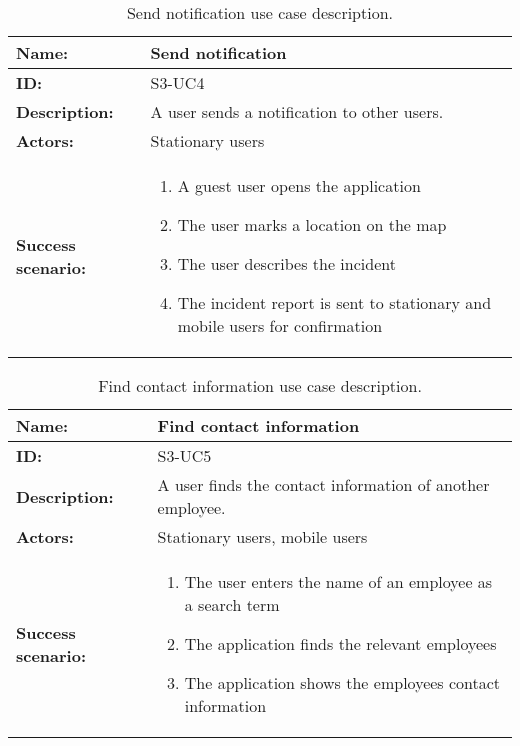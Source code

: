 \begin{table}[h!]
    \centering
    \begin{tabularx}{\textwidth}{|l|X|}
        \hline
        \textbf{Name:}  & Send notification \\ \hline
        \textbf{ID:}    & S3-UC4 \\ \hline
        \textbf{Description:} & A user sends a notification to other users. \\ \hline
        \textbf{Actors:} & Stationary users \\ \hline
        \textbf{Success scenario:} & 
        \begin{enumerate}
            \item A guest user opens the application
            \item The user marks a location on the map
            \item The user describes the incident
            \item The incident report is sent to stationary and mobile users for confirmation
        \end{enumerate}
        \\ \hline
    \end{tabularx}
    \caption{Send notification use case description.}
    \label{tab:s3-uc4}
\end{table}

\begin{table}[h!]
    \centering
    \begin{tabularx}{\textwidth}{|l|X|}
        \hline
        \textbf{Name:}  & Find contact information \\ \hline
        \textbf{ID:}    & S3-UC5 \\ \hline
        \textbf{Description:} & A user finds the contact information of another employee. \\ \hline
        \textbf{Actors:} & Stationary users, mobile users \\ \hline
        \textbf{Success scenario:} & 
        \begin{enumerate}
            \item The user enters the name of an employee as a search term
            \item The application finds the relevant employees
            \item The application shows the employees contact information
        \end{enumerate}
        \\ \hline
    \end{tabularx}
    \caption{Find contact information use case description.}
    \label{tab:s3-uc5}
\end{table}

